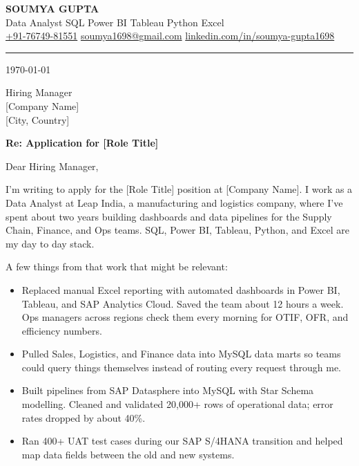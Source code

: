 \documentclass[10pt, letterpaper]{article}
\begin{document}

\begin{center}
  {\LARGE\bfseries SOUMYA GUPTA}\\[2pt]
  {\small\color{muted}Data Analyst \textbar{} SQL \textbar{} Power BI \textbar{} Tableau \textbar{} Python \textbar{} Excel}\\[3pt]
  {\small
  \href{tel:+917674981551}{+91-76749-81551}\enspace\textbullet\enspace
  \href{mailto:soumya1698@gmail.com}{soumya1698@gmail.com}\enspace\textbullet\enspace
  \href{https://linkedin.com/in/soumya-gupta1698}{linkedin.com/in/soumya-gupta1698}}
\end{center}

\vspace{2pt}
\textcolor{accent}{\rule{\linewidth}{0.5pt}}
\vspace{4pt}

\today

\vspace{4pt}

Hiring Manager\\
{[Company Name]}\\
{[City, Country]}

\vspace{2pt}

{\bfseries\color{accent}Re: Application for [Role Title]}

Dear Hiring Manager,

I'm writing to apply for the [Role Title] position at [Company Name]. I work as a Data Analyst at Leap India, a manufacturing and logistics company, where I've spent about two years building dashboards and data pipelines for the Supply Chain, Finance, and Ops teams. SQL, Power BI, Tableau, Python, and Excel are my day to day stack.

A few things from that work that might be relevant:

\begin{itemize}
  \item Replaced manual Excel reporting with automated dashboards in Power BI, Tableau, and SAP Analytics Cloud. Saved the team about 12 hours a week. Ops managers across regions check them every morning for OTIF, OFR, and efficiency numbers.
  \item Pulled Sales, Logistics, and Finance data into MySQL data marts so teams could query things themselves instead of routing every request through me.
  \item Built pipelines from SAP Datasphere into MySQL with Star Schema modelling. Cleaned and validated 20,000+ rows of operational data; error rates dropped by about 40\%.
  \item Ran 400+ UAT test cases during our SAP S/4HANA transition and helped map data fields between the old and new systems.
\end{itemize}
\end{document}
